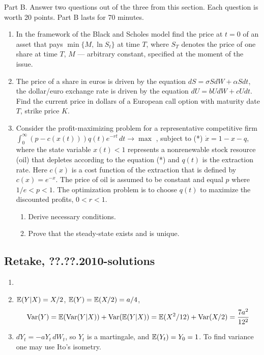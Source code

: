 \documentclass[pdftex,12pt,a4paper]{article}
\begin{document}
Part B.
Answer two questions out of the three from this section. Each question is worth 20 points.
Part B lasts for 70 minutes.

\begin{enumerate}[resume]
\item In the framework of the Black and Scholes model find the price at $t=0$  of an asset that pays $\min\{M,\ln S_t\}$  at time $T$, where $S_T$ denotes the price of one share at time $T$,  $M$ --- arbitrary constant, specified at the moment of the issue.

\item The price of a share in euros is driven by the equation $dS=\sigma S dW+\alpha S dt$, the dollar/euro exchange rate is driven by the equation $dU=b U dW+c U dt$. Find the current price in dollars of a European call option with maturity date $T$, strike price $K$.

\item Consider the profit-maximizing problem for a representative competitive firm 
$\int_0^{\infty} (p-c(x(t)))q(t)e^{-rt}\,dt \to \max$
, subject to (*) $\dot{x}=1-x-q$, where the state variable $x(t)<1$ represents a nonrenewable stock resource (oil) that depletes according to the equation (*) and $q(t)$ is the extraction rate. Here $c(x)$ is a cost function of the extraction that is defined by $c(x)=e^{-x}$. The price of oil is assumed to be constant and equal $p$ where $1/e<p<1$.  The optimization problem is to choose $q(t)$ to maximize the discounted profits, $0<r<1$.
\begin{enumerate}
\item Derive necessary conditions.
\item Prove that the steady-state exists and is unique. 
\end{enumerate} 

\end{enumerate}

\subsection{Retake, ??.??.2010-solutions}

\begin{enumerate}
\item
\item $\mathbb{E}(Y|X)=X/2$, $\mathbb{E}(Y)=\mathbb{E}(X/2)=a/4$, 
\[
\operatorname{Var}(Y)=\mathbb{E}(\operatorname{Var}(Y|X))+\operatorname{Var}(\mathbb{E}(Y|X))=\mathbb{E}(X^2/12)+\operatorname{Var}(X/2)=\frac{7a^2}{12^2}
\]
\item $dY_t=-a Y_t \, dW_t$, so $Y_t$ is a martingale, and $\mathbb{E}(Y_t)=Y_0=1$. To find variance one may use Ito's isometry.
\end{enumerate}
\end{document}
